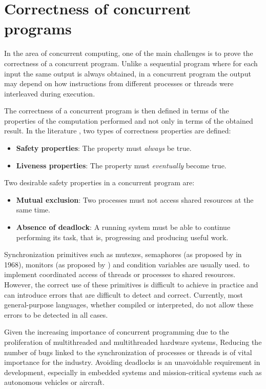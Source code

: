 \documentclass[../Thesis.tex]{subfiles}
\begin{document}
\section{Correctness of concurrent programs}

In the area of concurrent computing, one of the main challenges is
to prove the correctness of a concurrent program.
Unlike a sequential program where for each input the same output
is always obtained, in a concurrent program the output may depend
on how instructions from different processes or threads were interleaved during execution.

The correctness of a concurrent program is then defined
in terms of the properties of the computation performed
and not only in terms of the obtained result.
In the literature \cite{ben-ari2006, coulouris2012, tanenbaum2017},
two types of correctness properties are defined:

\begin{itemize}
    \item \textbf{Safety properties}: The property must \emph{always} be true.
    \item \textbf{Liveness properties}: The property must \emph{eventually} become true.

\end{itemize}

Two desirable safety properties in a concurrent program are:

\begin{itemize}
    \item \textbf{Mutual exclusion}: Two processes must not access shared resources at the same time.
    \item \textbf{Absence of deadlock}: A running system must be able to continue performing its task,
          that is, progressing and producing useful work.
\end{itemize}

Synchronization primitives such as mutexes, semaphores (as proposed by \cite{Dijkstra2002} in 1968),
monitors (as proposed by \cite{hoare1974monitors}) and condition variables are usually used.
to implement coordinated access of threads or processes to shared resources.
However, the correct use of these primitives is difficult to achieve in practice
and can introduce errors that are difficult to detect and correct.
Currently, most general-purpose languages, whether compiled or interpreted,
do not allow these errors to be detected in all cases.

Given the increasing importance of concurrent programming due to the proliferation of multithreaded and multithreaded hardware systems,
Reducing the number of bugs linked to the synchronization of processes or threads is of vital importance for the industry.
Avoiding deadlocks is an unavoidable requirement in development,
especially in embedded systems and mission-critical systems such as autonomous vehicles or aircraft.
\end{document}
